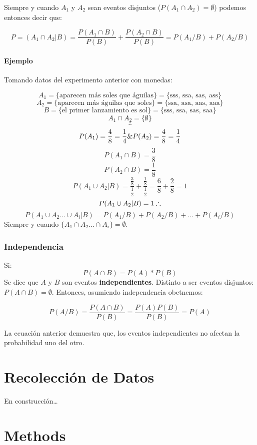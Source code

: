 \documentclass[]{book}
\begin{document}
Siempre y cuando \(A_1\) y \(A_2\) sean eventos disjuntos
(\(P(A_1\cap A_2) = \emptyset\)) podemos entonces decir que:

\[P = (A_1 \cap A_2 \vert B) = \frac {P(A_1 \cap B)}{P(B)}+ \frac {P(A_2 \cap B)}{P(B)} = P(A_1/B) + P(A_2/B)\]

\subsubsection{Ejemplo}\label{ejemplo-1}

Tomando datos del experimento anterior con monedas:

\[A_1 = \{\text{aparecen más soles que águilas}\} = \{\text{sss, ssa, sas, ass}\}\]
\[A_2 = \{\text{aparecen más águilas que soles}\} = \{\text{ssa, asa, aas, aaa}\}\]
\[B = \{\text{el primer lanzamiento es sol}\} = \{\text{sss, ssa, sas, saa}\}\]
\[A_1 \cap A_2 = \{\emptyset\}\] \[\therefore\]
\[P(A_1) = \frac {4}{8} = \frac {1}{4}\space \& \space P(A_2) = \frac {4}{8} = \frac {1}{4}\]
\[P(A_1\cap B) = \frac{3}{8}\] \[P(A_2\cap B) = \frac{1}{8}\]
\[P(A_1\cup A_2\vert B) = \frac {\frac{3}{8}}{\frac{1}{2}} + \frac{\frac{1}{8}}{\frac{1}{2}} = \frac{6}{8} + \frac{2}{8} = 1\]
\[P(A_1\cup A_2\vert B) = 1 \space \therefore\]
\[P(A_1\cup A_2...\cup A_i \vert B) = P(A_1/B) + P(A_2/B)+...+ P(A_i/B)\]
Siempre y cuando \(\{A_1\cap A_2...\cap A_i\}= \emptyset\).

\subsection{Independencia}\label{independencia}

Si: \[P(A\cap B) = P(A)*P(B)\] Se dice que \(A\) y \(B\) son eventos
\textbf{independientes}. Distinto a ser eventos disjuntos:
\(P(A\cap B) = \emptyset\). Entonces, asumiendo independencia obetnemos:

\[P(A/B) = \frac {P(A\cap B)}{P(B)} = \frac{P(A)P(B)}{P(B)} = P(A)\]

La ecuación anterior demuestra que, los eventos independientes no
afectan la probabilidad uno del otro.

\chapter{Recolección de Datos}\label{recoleccion-de-datos}

En construcción\ldots{}

\chapter{Methods}\label{methods}
\end{document}
